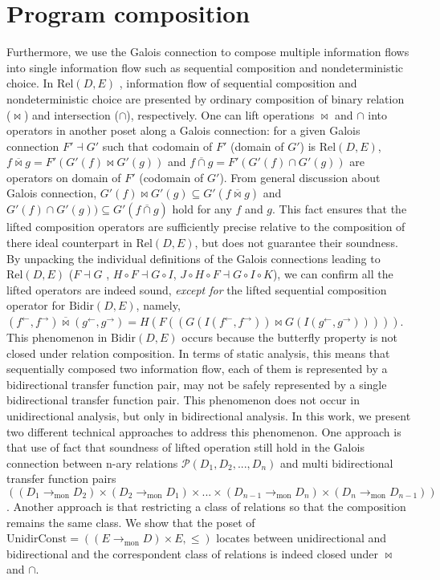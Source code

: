 \documentclass{easychair}
\theoremstyle{definition}
\newcommand{\Pow}{\mathcal{P}}
\newcommand{\Rel}{\mathrm{Rel}}
\newcommand{\Bidir}{\mathrm{Bidir}}
\newcommand{\UnidirConst}{\mathrm{UnidirConst}}
\newcommand{\tomon}{\to_{\mathrm{mon}}}
\newcommand{\ff}{{f^{\rightarrow}}}
\newcommand{\fb}{{f^{\leftarrow}}}
\newcommand{\gf}{{g^{\rightarrow}}}
\newcommand{\gb}{{g^{\leftarrow}}}
\newcommand{\comp}{\circ}
\newcommand{\bowtielift}{\mathbin{\overline{\bowtie}}}
\newcommand{\caplift}{\mathbin{\overline{\cap}}}
\begin{document}
\section{Program composition}
Furthermore, we use the Galois connection to compose multiple information flows into single
information flow such as sequential composition and nondeterministic choice. In $\Rel(D, E)$ ,
information flow of sequential composition and nondeterministic choice are presented by ordinary composition of binary relation ($\bowtie$) and intersection ($\cap$), respectively. One can lift operations $\bowtie$ and $\cap$
into operators in another poset along a Galois connection: for a given Galois connection $F' \dashv G'$ such that codomain of $F'$ (domain of $G'$) is $\Rel(D, E)$, $f \bowtielift g = F'(G'(f) \bowtie G'(g))$ and $f \caplift g = F'(G'(f) \cap G'(g))$ are operators on domain of $F'$ (codomain of $G'$).
From general discussion about Galois connection,
$G'(f) \bowtie G'(g) \subseteq G' (f \bowtielift g)$ and $G'(f) \cap G'(g)) \subseteq G'(f \caplift g)$ hold for any $f$ and $g$.
This fact ensures that the lifted composition operators are sufficiently precise relative to the composition of there ideal counterpart in $\Rel(D, E)$, but does not guarantee their soundness.
By unpacking the individual definitions of the Galois connections leading to $\Rel(D ,E)$ ($F \dashv G$ , $H \comp F \dashv G \comp I$, $J \comp H \comp F \dashv G \comp I \comp K$), we can confirm all the lifted operators are indeed sound, \emph{except for} the lifted sequential composition operator for $\Bidir(D, E)$, namely, $(\fb , \ff) \bowtielift (\gb , \gf) = H(F((G(I(\fb , \ff)) \bowtie G(I(\gb , \gf)))))$. This phenomenon in $\Bidir(D, E)$ occurs because the butterfly property is not closed under relation composition.
In terms of static analysis, this means that sequentially composed two information flow, each of them is represented by a bidirectional transfer function pair, may not be safely represented by a single bidirectional transfer function pair. This phenomenon does not occur in unidirectional analysis, but only in bidirectional analysis.
In this work, we present two different technical approaches to address this phenomenon.
One approach is that use of fact that soundness of lifted operation still hold in the Galois connection between n-ary relations $\Pow(D_{1}, D_{2}, ... , D_{n})$ and multi bidirectional transfer function pairs $((D_{1} \tomon D_{2}) \times (D_{2} \tomon D_{1}) \times ... \times (D_{n-1} \tomon D_{n}) \times (D_{n} \tomon D_{n-1}))$.
Another approach is that restricting a class of relations so that the composition remains the same class. We show that the poset of $\UnidirConst = ((E \tomon D) \times E, \leq)$ locates between unidirectional and bidirectional and the correspondent class of relations is indeed closed under $\bowtie$ and $\cap$.
\end{document}
